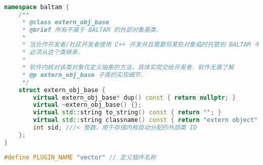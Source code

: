 
\begin{issues}
\issueDraft
\end{issues}

\begin{lstlisting}[language=cpp, caption=extern\_obj.h节选]
namespace baltam {
    /**
     * @class extern_obj_base
     * @brief 所有不属于 BALTAM 的外部对象基类．
     *
     * 当合作开发者/社区开发者使用 C++ 开发并且需要将某些对象临时托管到 BALTAM 中时，
     * 必须从这个类继承．
     *
     * 软件内核对该类对象仅定义抽象的方法，具体实现交给开发者．软件无需了解
     * @p extern_obj_base 子类的实现细节．
     */
    struct extern_obj_base {
        virtual extern_obj_base* dup() const { return nullptr; }
        virtual ~extern_obj_base() {};
        virtual std::string to_string() const { return ""; }
        virtual std::string classname() const { return "extern object"; };
        int sid; ///< 整数，用于存储内核自动分配的外部类 ID
    };
}
\end{lstlisting}


\begin{lstlisting}[language=cpp,caption=vector 插件的 main.cpp]
#define PLUGIN_NAME "vector" // 定义插件名称

\end{lstlisting}